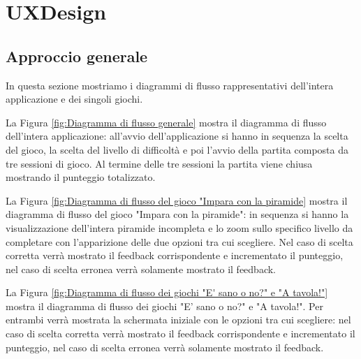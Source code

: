 \section{UXDesign} \label{sec:design}

\subsection{Approccio generale} \label{subsec:app}
In questa sezione mostriamo i diagrammi di flusso rappresentativi dell'intera applicazione e dei singoli giochi.

La Figura \ref{fig:Diagramma di flusso generale} mostra il diagramma di flusso dell'intera applicazione: all'avvio dell'applicazione si hanno in sequenza la scelta del gioco, la scelta del livello di difficoltà e poi l'avvio della partita composta da tre sessioni di gioco. Al termine delle tre sessioni la partita viene chiusa mostrando il punteggio totalizzato.

La Figura \ref{fig:Diagramma di flusso del gioco "Impara con la piramide} mostra il diagramma di flusso del gioco "Impara con la piramide": in sequenza si hanno la visualizzazione dell'intera piramide incompleta e lo zoom sullo specifico livello da completare con l'apparizione delle due opzioni tra cui scegliere. Nel caso di scelta corretta verrà mostrato il feedback corrispondente e incrementato il punteggio, nel caso di scelta erronea verrà solamente mostrato il feedback.

La Figura \ref{fig:Diagramma di flusso dei giochi "E' sano o no?" e "A tavola!"} mostra il diagramma di flusso dei giochi "E' sano o no?" e "A tavola!". Per entrambi verrà mostrata la schermata iniziale con le opzioni tra cui scegliere: nel caso di scelta corretta verrà mostrato il feedback corrispondente e incrementato il punteggio, nel caso di scelta erronea verrà solamente mostrato il feedback.

